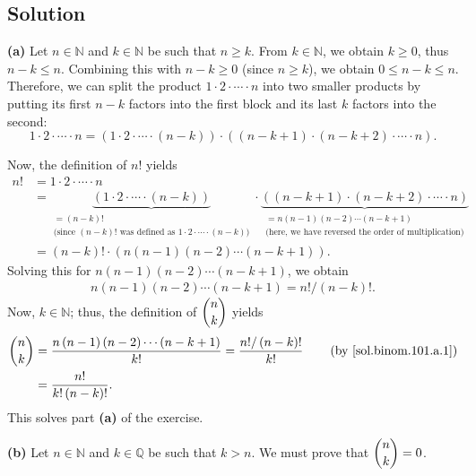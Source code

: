 \documentclass[paper=a4, fontsize=12pt]{scrartcl} %
\newcommand{\QQ}{\mathbb{Q}} %
\newcommand{\NN}{\mathbb{N}} %
\newcommand{\tup}[1]{\left( #1 \right)}
\newcommand{\underbrack}[2]{\underbrace{#1}_{\substack{#2}}}
\theoremstyle{plainsl}
\theoremstyle{definition}
\theoremstyle{remark}
\begin{document}
\subsection{Solution}

\textbf{(a)}
Let $n \in \NN$ and $k \in \NN$ be such that $n \geq k$.
From $k \in \NN$, we obtain $k \geq 0$, thus $n-k \leq n$.
Combining this with $n-k \geq 0$ (since $n \geq k$),
we obtain $0 \leq n-k \leq n$.
Therefore, we can split the product $1 \cdot 2 \cdot \cdots \cdot n$
into two smaller products by putting its first $n-k$ factors
into the first block and its last $k$ factors into the second:
\[
1 \cdot 2 \cdot \cdots \cdot n
= \tup{1 \cdot 2 \cdot \cdots \cdot \tup{n-k}}
  \cdot
  \tup{\tup{n-k+1} \cdot \tup{n-k+2} \cdot \cdots \cdot n} .
\]

Now, the definition of $n!$ yields
\begin{align*}
n!
&= 1 \cdot 2 \cdot \cdots \cdot n \\
&= \underbrack{\tup{1 \cdot 2 \cdot \cdots \cdot \tup{n-k}}}
              {= \tup{n-k}! \\ \text{(since $\tup{n-k}!$ was
                   defined as $1 \cdot 2 \cdot \cdots \cdot \tup{n-k}$)}}
     \cdot
     \underbrack{\tup{\tup{n-k+1} \cdot \tup{n-k+2} \cdot \cdots \cdot n}}
                {= n \tup{n-1} \tup{n-2} \cdots \tup{n-k+1} \\
                 \text{(here, we have reversed the order of multiplication)}} \\
&= \tup{n-k}! \cdot \tup{n \tup{n-1} \tup{n-2} \cdots \tup{n-k+1}} .
\end{align*}
Solving this for $n \tup{n-1} \tup{n-2} \cdots \tup{n-k+1}$,
we obtain
\begin{align}
n \tup{n-1} \tup{n-2} \cdots \tup{n-k+1}
= n! / \tup{n-k}! .
\label{sol.binom.101.a.1}
\end{align}
Now, $k \in \NN$; thus, the definition of $\dbinom{n}{k}$
yields
\begin{align*}
\dbinom{n}{k}
&= \dfrac{ n \tup{n-1} \tup{n-2} \cdots \tup{n-k+1} }{k!}
 = \dfrac{n! / \tup{n-k}!}{k!}
 \qquad \tup{\text{by \eqref{sol.binom.101.a.1}}} \\
&= \dfrac{n!}{k! \tup{n-k}!} .
\end{align*}
This solves part \textbf{(a)} of the exercise.

\vspace{0.8pc}

\textbf{(b)}
Let $n \in \NN$ and $k \in \QQ$ be such that $k > n$.
We must prove that $\dbinom{n}{k} = 0$.
\end{document}
